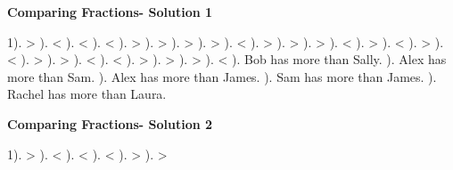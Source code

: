 \documentclass{article}%
\begin{document}
\newpage%
\large%
\begin{center}%
\textbf{Comparing Fractions- Solution 1}%
\newline%
\end{center} \normalsize%
1). >%
). <%
). <%
). <%
). >%
). >%
). >%
). >%
). <%
). >%
). >%
). >%
). <%
). >%
). <%
). >%
). <%
). >%
). >%
). <%
). <%
). >%
). >%
). >%
). <%
). Bob has more than Sally.%
). Alex has more than Sam.%
). Alex has more than James.%
). Sam has more than James.%
). Rachel has more than Laura.%
\newline%
\newpage%
\large%
\begin{center}%
\textbf{Comparing Fractions- Solution 2}%
\newline%
\end{center} \normalsize%
1). >%
). <%
). <%
). <%
). >%
). >%
\end{document}
